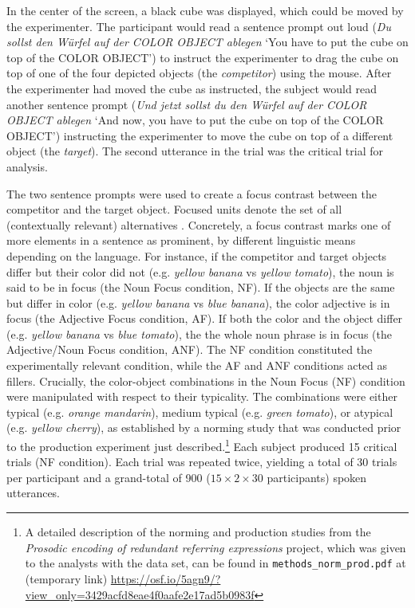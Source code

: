 \documentclass[Review,times,sageh]{sagej}
\begin{document}
In the center of the screen, a black cube was displayed, which could be
moved by the experimenter. The participant would read a sentence prompt
out loud (\emph{Du sollst den Würfel auf der COLOR OBJECT ablegen} `You
have to put the cube on top of the COLOR OBJECT') to instruct the
experimenter to drag the cube on top of one of the four depicted objects
(the \emph{competitor}) using the mouse. After the experimenter had
moved the cube as instructed, the subject would read another sentence
prompt (\emph{Und jetzt sollst du den Würfel auf der COLOR OBJECT
ablegen} `And now, you have to put the cube on top of the COLOR OBJECT')
instructing the experimenter to move the cube on top of a different
object (the \emph{target}). The second utterance in the trial was the
critical trial for analysis.

The two sentence prompts were used to create a focus contrast between
the competitor and the target object. Focused units denote the set of
all (contextually relevant) alternatives
\citep[e.g.][]{rooth1992theory}. Concretely, a focus contrast marks one
of more elements in a sentence as prominent, by different linguistic
means depending on the language. For instance, if the competitor and
target objects differ but their color did not (e.g. \emph{yellow banana}
vs \emph{yellow tomato}), the noun is said to be in focus (the Noun
Focus condition, NF). If the objects are the same but differ in color
(e.g. \emph{yellow banana} vs \emph{blue banana}), the color adjective
is in focus (the Adjective Focus condition, AF). If both the color and
the object differ (e.g. \emph{yellow banana} vs \emph{blue tomato}), the
the whole noun phrase is in focus (the Adjective/Noun Focus condition,
ANF). The NF condition constituted the experimentally relevant
condition, while the AF and ANF conditions acted as fillers. Crucially,
the color-object combinations in the Noun Focus (NF) condition were
manipulated with respect to their typicality. The combinations were
either typical (e.g. \emph{orange mandarin}), medium typical (e.g.
\emph{green tomato}), or atypical (e.g. \emph{yellow cherry}), as
established by a norming study that was conducted prior to the
production experiment just described.\footnote{A detailed description of
  the norming and production studies from the \emph{Prosodic encoding of
  redundant referring expressions} project, which was given to the
  analysts with the data set, can be found in
  \texttt{methods\_norm\_prod.pdf} at (temporary link)
  \url{https://osf.io/5agn9/?view_only=3429acfd8eae4f0aafe2e17ad5b0983f}}
Each subject produced 15 critical trials (NF condition). Each trial was
repeated twice, yielding a total of 30 trials per participant and a
grand-total of 900 (\(15 \times 2 \times 30\) participants) spoken
utterances.
\end{document}
